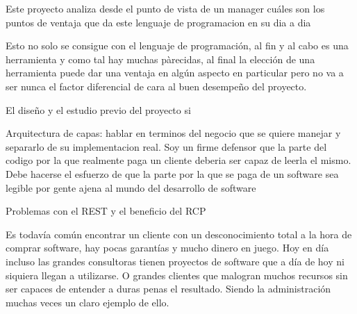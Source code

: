 Este proyecto analiza desde el punto de vista de un manager cuáles son los puntos de ventaja que da este lenguaje de programacion en su dia a dia

Esto no solo se consigue con el lenguaje de programación, al fin y al cabo es una herramienta y como tal hay muchas pàrecidas, al final la elección de una herramienta puede dar una ventaja en algún aspecto en particular pero no va a ser nunca el factor diferencial de cara al buen desempeño del proyecto.

El diseño y el estudio previo del proyecto si

Arquitectura de capas: hablar en terminos del negocio que se quiere manejar y separarlo de su implementacion real. Soy un firme defensor que la parte del codigo por la que realmente paga un cliente deberia ser capaz de leerla el mismo. Debe hacerse el esfuerzo de que la parte por la que se paga de un software sea legible por gente ajena al mundo del desarrollo de software

Problemas con el REST y el beneficio del RCP


Es todavía común encontrar un cliente con un desconocimiento total a la hora de comprar software, hay pocas garantías y mucho dinero en juego. Hoy en día incluso las grandes consultoras tienen proyectos de software que a día de hoy ni siquiera llegan a utilizarse. O grandes clientes que malogran muchos recursos sin ser capaces de entender a duras penas el resultado. Siendo la administración muchas veces un claro ejemplo de ello.